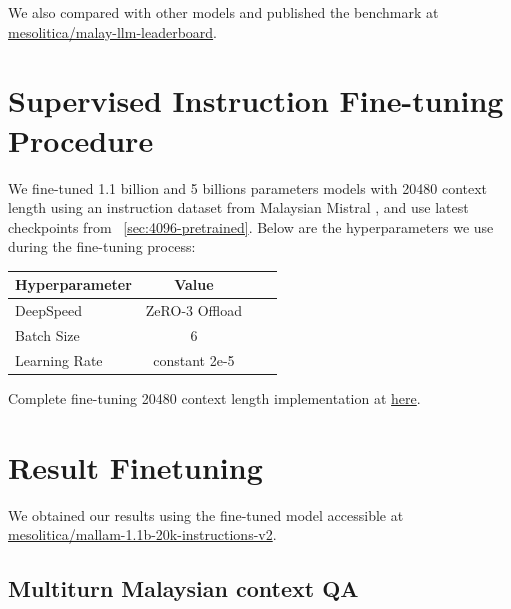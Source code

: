 \documentclass[preprint]{article}
\begin{document}
We also compared with other models and published the benchmark at \href{https://huggingface.co/spaces/mesolitica/malay-llm-leaderboard}{mesolitica/malay-llm-leaderboard}.

\section{Supervised Instruction Fine-tuning Procedure}

We fine-tuned 1.1 billion and 5 billions parameters models with 20480 context length using an instruction dataset from Malaysian Mistral \cite{zolkepli2024large}, and use latest checkpoints from ~\ref{sec:4096-pretrained}. Below are the hyperparameters we use during the fine-tuning process:

\begin{table}[h]
  \centering
  \begin{tabular}{lccl}
    \hline
    \textbf{Hyperparameter} & \textbf{Value} \\
    \hline
    DeepSpeed               & ZeRO-3 Offload \\
    Batch Size              & 6              \\
    Learning Rate           & constant 2e-5  \\

    \hline
  \end{tabular}
\end{table}

Complete fine-tuning 20480 context length implementation at \href{https://github.com/mesolitica/malaya/tree/5.1/session/mistral#mallam-11b}{here}.

\section{Result Finetuning}\label{sec:result-finetuning}

We obtained our results using the fine-tuned model accessible at \href{https://huggingface.co/mesolitica/mallam-1.1b-20k-instructions-v2}{mesolitica/mallam-1.1b-20k-instructions-v2}.

\subsection{Multiturn Malaysian context QA}
\end{document}
